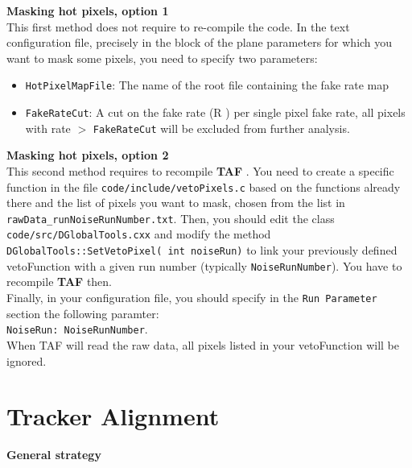 \documentclass[a4paper, 12pt, twoside]{article}
\newif\ifwithcomment
\newcommand{\comment}[1]{\ifwithcomment {\textcolor{blue}{\it#1}} \fi}
\newcommand{\TAF}{{\bf TAF }}
\begin{document}
\noindent
{\bf Masking hot pixels, option 1}\\

\noindent
This first method does not require to re-compile the code. In the text configuration file, precisely in the block of the plane parameters for which you want to mask some pixels, you need to specify two parameters:\\
\begin{itemize}
\item {\tt HotPixelMapFile}: The name of the root file containing the fake rate map
\item {\tt FakeRateCut}: A cut on the fake rate (R ) per single pixel fake rate, all pixels with rate $>$ {\tt FakeRateCut} will be excluded from further analysis.
\end{itemize}

\noindent
{\bf Masking hot pixels, option 2}\\

\noindent
This second method requires to recompile \TAF. You need to create a specific function in the file {\tt  code/include/vetoPixels.c} based on the functions already there and the list of pixels you want to mask, chosen from the list in {\tt rawData\_runNoiseRunNumber.txt}. Then, you should edit the class {\tt code/src/DGlobalTools.cxx} and modify the method {\tt DGlobalTools::SetVetoPixel( int noiseRun)} to link your previously defined vetoFunction with a given run number (typically {\tt NoiseRunNumber}). You have to recompile \TAF then.\\
Finally, in your configuration file, you should specify in the {\tt Run Parameter} section the following paramter:\\
{\tt NoiseRun: NoiseRunNumber}.\\
When TAF will read the raw data, all pixels listed in your vetoFunction will be ignored.


\vspace{2cm}

\section{Tracker Alignment}
\label{secAlign}

\comment{There is no explanation about the choice of the hit with respect to a track, wether it is the nearest or any of them. The method to align ladder with minivector is not described here.}

\noindent 
{\bf General strategy}
\end{document}
